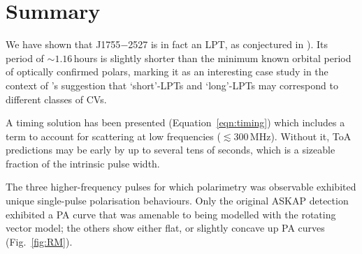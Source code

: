 \documentclass[fleqn,usenatbib]{mnras}
\newcommand{\src}{J1755$-$2527}
\newcommand{\Fig}{Fig.}
\newcommand{\Eqn}{Equation}
\begin{document}



\section{Summary} \label{sec:summary}

We have shown that \src{} is in fact an LPT, as conjectured in ).
Its period of ${\sim}1.16\,$hours is slightly shorter than the minimum known orbital period of optically confirmed polars, marking it as an interesting case study in the context of \citet{2025A&A...695L...8R}'s suggestion that `short'-LPTs and `long'-LPTs may correspond to different classes of CVs.

A timing solution has been presented (\Eqn~\ref{eqn:timing}) which includes a term to account for scattering at low frequencies ($\lesssim 300\,$MHz).
Without it, ToA predictions may be early by up to several tens of seconds, which is a sizeable fraction of the intrinsic pulse width.

The three higher-frequency pulses for which polarimetry was observable exhibited unique single-pulse polarisation behaviours.
Only the original ASKAP detection exhibited a PA curve that was amenable to being modelled with the rotating vector model; the others show either flat, or slightly concave up PA curves (\Fig~\ref{fig:RM}).
\end{document}
